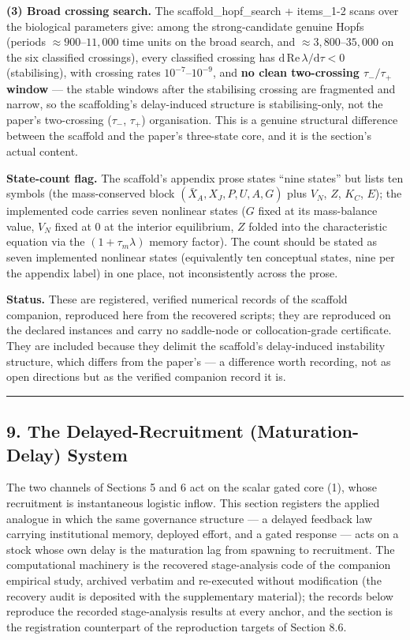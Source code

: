 \documentclass[11pt]{article}
\begin{document}
\textbf{(3) Broad crossing search.} The scaffold\_hopf\_search +
items\_1-2 scans over the biological parameters give: among the
strong-candidate genuine Hopfs (periods \(\approx 900\)--\(11{,}000\)
time units on the broad search, and \(\approx 3{,}800\)--\(35{,}000\) on
the six classified crossings), every classified crossing has
\(\mathrm{d\,Re}\,\lambda/\mathrm{d}\tau < 0\) (stabilising), with
crossing rates \(10^{-7}\)--\(10^{-9}\), and \textbf{no clean
two-crossing \(\tau_-/\tau_+\) window} --- the stable windows after the
stabilising crossing are fragmented and narrow, so the scaffolding's
delay-induced structure is stabilising-only, not the paper's
two-crossing (\(\tau_-\), \(\tau_+\)) organisation. This is a genuine
structural difference between the scaffold and the paper's three-state
core, and it is the section's actual content.

\textbf{State-count flag.} The scaffold's appendix prose states ``nine
states'' but lists ten symbols (the mass-conserved block
\((\bar X_A, X_J, P, U, A, G)\) plus \(V_N\), \(Z\), \(K_C\), \(E\));
the implemented code carries seven nonlinear states (\(G\) fixed at its
mass-balance value, \(V_N\) fixed at \(0\) at the interior equilibrium,
\(Z\) folded into the characteristic equation via the
\((1+\tau_m\lambda)\) memory factor). The count should be stated as
seven implemented nonlinear states (equivalently ten conceptual states,
nine per the appendix label) in one place, not inconsistently across the
prose.

\textbf{Status.} These are registered, verified numerical records of the
scaffold companion, reproduced here from the recovered scripts; they are
reproduced on the declared instances and carry no saddle-node or
collocation-grade certificate. They are included because they delimit
the scaffold's delay-induced instability structure, which differs from
the paper's --- a difference worth recording, not as open directions but
as the verified companion record it is.

\begin{center}\rule{0.5\linewidth}{0.5pt}\end{center}

\subsection{9. The Delayed-Recruitment (Maturation-Delay)
System}\label{the-delayed-recruitment-maturation-delay-system}

The two channels of Sections 5 and 6 act on the scalar gated core (1),
whose recruitment is instantaneous logistic inflow. This section
registers the applied analogue in which the same governance structure
--- a delayed feedback law carrying institutional memory, deployed
effort, and a gated response --- acts on a stock whose own delay is the
maturation lag from spawning to recruitment. The computational machinery
is the recovered stage-analysis code of the companion empirical study,
archived verbatim and re-executed without modification (the recovery
audit is deposited with the supplementary material); the records below
reproduce the recorded stage-analysis results at every anchor, and the
section is the registration counterpart of the reproduction targets of
Section 8.6.
\end{document}
